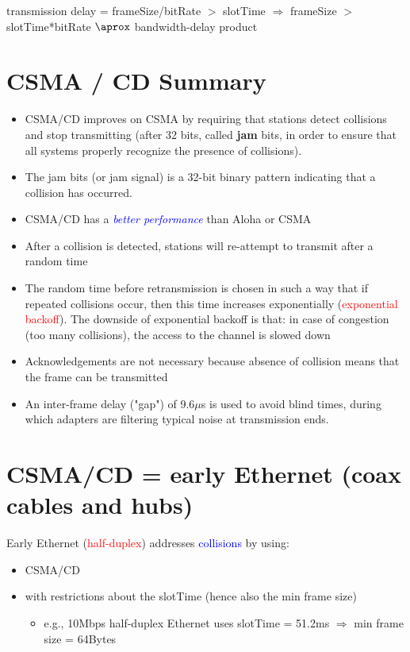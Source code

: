 \documentclass[11pt]{article}
\begin{document}
\begin{center}
	transmission delay = frameSize/bitRate $>$ slotTime
$\Rightarrow$ frameSize $>$ slotTime*bitRate $\aprox$ bandwidth-delay product
\end{center}

\section*{CSMA / CD Summary}

\begin{itemize}
	\item CSMA/CD improves on CSMA by requiring that stations detect collisions and stop transmitting (after 32 bits, called \textbf{jam} bits, in order to ensure that all systems properly recognize the presence of collisions).
	\item The jam bits (or jam signal) is a 32-bit binary pattern indicating that a collision has occurred.
	\item CSMA/CD has a \textit{\textcolor{blue}{better performance}} than Aloha or CSMA
	\item After a collision is detected, stations will re-attempt to transmit after a random time
	\item The random time before retransmission is chosen in such a way that if repeated collisions occur, then this time increases exponentially (\textcolor{red}{exponential backoff}). 
	The downside of exponential backoff is that: in case of congestion (too many collisions), the access to the channel is slowed down
	\item Acknowledgements are not necessary because absence of collision means that the frame can be transmitted
	\item An inter-frame delay ("gap") of 9.6$\mu$s is used to avoid blind times, during which adapters are filtering typical noise at transmission ends.
\end{itemize}

\section*{CSMA/CD = early Ethernet (coax cables and hubs)}

Early Ethernet (\textcolor{red}{half-duplex}) addresses \textcolor{blue}{collisions} by using:
\begin{itemize}
	\item CSMA/CD
	\item with restrictions about the slotTime (hence also the min frame size)
		\begin{itemize}
			\item e.g., 10Mbps half-duplex Ethernet uses slotTime = 51.2ms $\Rightarrow$ min frame size = 64Bytes
		\end{itemize}
\end{itemize}
\end{document}
